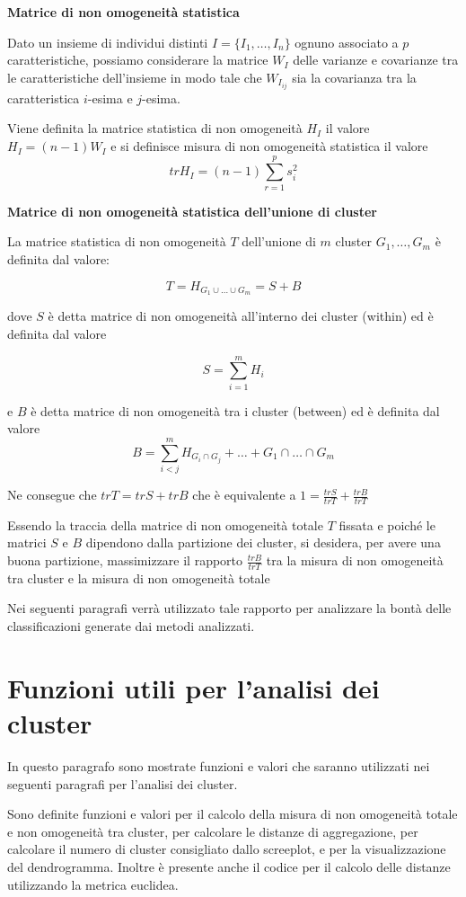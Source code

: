 \documentclass[]{book}
\begin{document}
\textbf{Matrice di non omogeneità statistica}

Dato un insieme di individui distinti \(I = \{I_1,\dots, I_n\}\) ognuno
associato a \(p\) caratteristiche, possiamo considerare la matrice
\(W_I\) delle varianze e covarianze tra le caratteristiche dell'insieme
in modo tale che \(W_{I_{ij}}\) sia la covarianza tra la caratteristica
\(i\)-esima e \(j\)-esima.

Viene definita la matrice statistica di non omogeneità \(H_I\) il valore
\(H_I = (n-1)W_I\) e si definisce misura di non omogeneità statistica il
valore \[trH_I = (n-1)\sum_{r=1}^{p}s_i^2\]

\textbf{Matrice di non omogeneità statistica dell'unione di cluster}

La matrice statistica di non omogeneità \(T\) dell'unione di \(m\)
cluster \(G_1,\dots,G_m\) è definita dal valore:

\[T = H_{G_1\cup \dots \cup G_m} = S + B\]

dove \(S\) è detta matrice di non omogeneità all'interno dei cluster
(within) ed è definita dal valore

\[S = \sum_{i=1}^m H_i\]

e \(B\) è detta matrice di non omogeneità tra i cluster (between) ed è
definita dal valore
\[B = \sum_{i<j}^m H_{G_i \cap G_j} + \dots + G_1 \cap \dots \cap G_m\]

Ne consegue che \(trT = trS + trB\) che è equivalente a
\(1 = \frac{trS}{trT} + \frac{trB}{trT}\)

Essendo la traccia della matrice di non omogeneità totale \(T\) fissata
e poiché le matrici \(S\) e \(B\) dipendono dalla partizione dei
cluster, si desidera, per avere una buona partizione, massimizzare il
rapporto \(\frac{trB}{trT}\) tra la misura di non omogeneità tra cluster
e la misura di non omogeneità totale

Nei seguenti paragrafi verrà utilizzato tale rapporto per analizzare la
bontà delle classificazioni generate dai metodi analizzati.

\section{Funzioni utili per l'analisi dei
cluster}\label{funzioni-utili-per-lanalisi-dei-cluster}

In questo paragrafo sono mostrate funzioni e valori che saranno
utilizzati nei seguenti paragrafi per l'analisi dei cluster.

Sono definite funzioni e valori per il calcolo della misura di non
omogeneità totale e non omogeneità tra cluster, per calcolare le
distanze di aggregazione, per calcolare il numero di cluster consigliato
dallo screeplot, e per la visualizzazione del dendrogramma. Inoltre è
presente anche il codice per il calcolo delle distanze utilizzando la
metrica euclidea.
\end{document}
